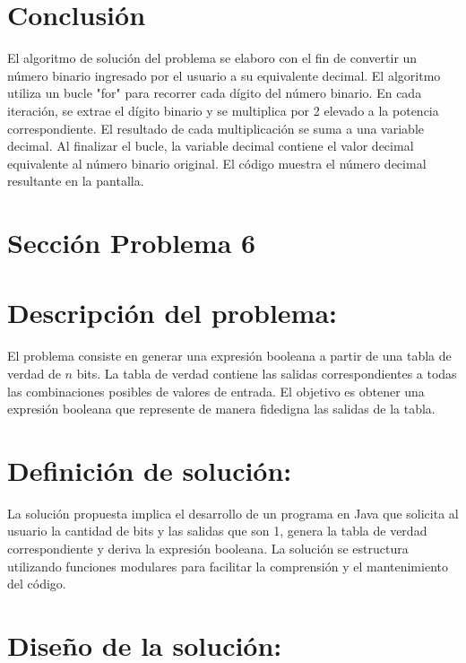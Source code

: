 \documentclass{IEEEcsmag}
\begin{document}
\section*{Conclusión}
El algoritmo de solución del problema se elaboro con el fin de convertir un número binario ingresado por el usuario a su equivalente decimal. El algoritmo utiliza un bucle "for" para recorrer cada dígito del número binario. En cada iteración, se extrae el dígito binario y se multiplica por 2 elevado a la potencia correspondiente. El resultado de cada multiplicación se suma a una variable decimal. Al finalizar el bucle, la variable decimal contiene el valor decimal equivalente al número binario original. El código muestra el número decimal resultante en la pantalla.
\clearpage










\section{Sección Problema 6}
\section*{Descripción del problema:}

El problema consiste en generar una expresión booleana a partir de una tabla de verdad de \(n\) bits. La tabla de verdad contiene las salidas correspondientes a todas las combinaciones posibles de valores de entrada. El objetivo es obtener una expresión booleana que represente de manera fidedigna las salidas de la tabla.

\section*{Definición de solución:}

La solución propuesta implica el desarrollo de un programa en Java que solicita al usuario la cantidad de bits y las salidas que son 1, genera la tabla de verdad correspondiente y deriva la expresión booleana. La solución se estructura utilizando funciones modulares para facilitar la comprensión y el mantenimiento del código.

\section*{Diseño de la solución:}
\end{document}
